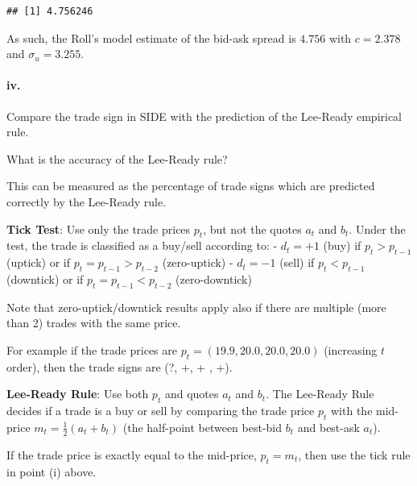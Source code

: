 \documentclass[
]{article}
\begin{document}
\begin{verbatim}
## [1] 4.756246
\end{verbatim}

As such, the Roll's model estimate of the bid-ask spread is
\(\mathbf{4.756}\) with \(c = 2.378\) and \(\sigma_u = 3.255\).

\paragraph{iv.}\label{iv.}

Compare the trade sign in SIDE with the prediction of the Lee-Ready
empirical rule.

What is the accuracy of the Lee-Ready rule?

This can be measured as the percentage of trade signs which are
predicted correctly by the Lee-Ready rule.

\textbf{Tick Test}: Use only the trade prices \(p_t\), but not the
quotes \(a_t\) and \(b_t\). Under the test, the trade is classified as a
buy/sell according to: - \(d_t = +1\) (buy) if \(p_t > p_{t-1}\)
(uptick) or if \(p_t = p_{t-1} > p_{t-2}\) (zero-uptick) - \(d_t = -1\)
(sell) if \(p_t < p_{t-1}\) (downtick) or if \(p_t = p_{t-1} < p_{t-2}\)
(zero-downtick)

Note that zero-uptick/downtick results apply also if there are multiple
(more than 2) trades with the same price.

For example if the trade prices are \(p_t = (19.9, 20.0, 20.0, 20.0)\)
(increasing \(t\) order), then the trade signs are (?, +, + , +).

\textbf{Lee-Ready Rule}: Use both \(p_t\) and quotes \(a_t\) and
\(b_t\). The Lee-Ready Rule decides if a trade is a buy or sell by
comparing the trade price \(p_t\) with the mid-price
\(m_t = \frac{1}{2} (a_t + b_t)\) (the half-point between best-bid
\(b_t\) and best-ask \(a_t\)).

If the trade price is exactly equal to the mid-price, \(p_t = m_t\),
then use the tick rule in point (i) above.
\end{document}
